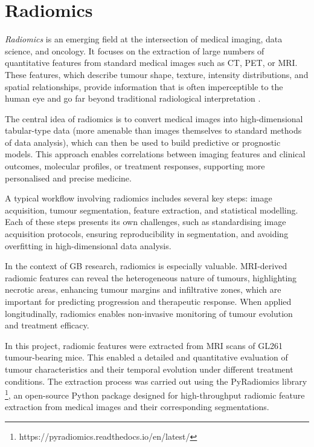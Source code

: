 \documentclass[12pt, a4paper]{report}
\begin{document}
\section{Radiomics}

\textit{Radiomics} is an emerging field at the intersection of medical imaging, data science, and oncology. It focuses on the extraction of large numbers of quantitative features from standard medical images such as CT, PET, or MRI. These features, which describe tumour shape, texture, intensity distributions, and spatial relationships, provide information that is often imperceptible to the human eye and go far beyond traditional radiological interpretation \cite{kumar2012radiomics}.

The central idea of radiomics is to convert medical images into high-dimensional tabular-type data (more amenable than images themselves to standard methods of data analysis), which can then be used to build predictive or prognostic models. This approach enables correlations between imaging features and clinical outcomes, molecular profiles, or treatment responses, supporting more personalised and precise medicine.

A typical workflow involving radiomics includes several key steps: image acquisition, tumour segmentation, feature extraction, and statistical modelling. Each of these steps presents its own challenges, such as standardising image acquisition protocols, ensuring reproducibility in segmentation, and avoiding overfitting in high-dimensional data analysis.

In the context of GB research, radiomics is especially valuable. MRI-derived radiomic features can reveal the heterogeneous nature of tumours, highlighting necrotic areas, enhancing tumour margins and infiltrative zones, which are important for predicting progression and therapeutic response. When applied longitudinally, radiomics enables non-invasive monitoring of tumour evolution and treatment efficacy.

In this project, radiomic features were extracted from MRI scans of GL261 tumour-bearing mice. This enabled a detailed and quantitative evaluation of tumour characteristics and their temporal evolution under different treatment conditions. The extraction process was carried out using the PyRadiomics library \footnote{https://pyradiomics.readthedocs.io/en/latest/}, an open-source Python package designed for high-throughput radiomic feature extraction from medical images and their corresponding segmentations.
\end{document}

